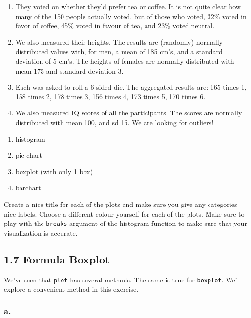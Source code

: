 \documentclass[]{article}
\providecommand{\tightlist}{%
  \setlength{\itemsep}{0pt}\setlength{\parskip}{0pt}}
\begin{document}
\begin{enumerate}
\def\labelenumi{\arabic{enumi}.}
\tightlist
\item
  They voted on whether they'd prefer tea or coffee. It is not quite
  clear how many of the 150 people actually voted, but of those who
  voted, 32\% voted in favor of coffee, 45\% voted in favour of tea, and
  23\% voted neutral.
\item
  We also measured their heights. The results are (randomly) normally
  distributed values with, for men, a mean of 185 cm's, and a standard
  deviation of 5 cm's. The heights of females are normally distributed
  with mean 175 and standard deviation 3.
\item
  Each was asked to roll a 6 sided die. The aggregated results are: 165
  times 1, 158 times 2, 178 times 3, 156 times 4, 173 times 5, 170 times
  6.
\item
  We also measured IQ scores of all the participants. The scores are
  normally distributed with mean 100, and sd 15. We are looking for
  outliers!
\end{enumerate}

\begin{enumerate}
\def\labelenumi{\alph{enumi}.}
\tightlist
\item
  histogram
\item
  pie chart
\item
  boxplot (with only 1 box)
\item
  barchart
\end{enumerate}

Create a nice title for each of the plots and make sure you give any
categories nice labels. Choose a different colour yourself for each of
the plots. Make sure to play with the \texttt{breaks} argument of the
histogram function to make sure that your visualization is accurate.

\hypertarget{formula-boxplot}{%
\subsection{1.7 Formula Boxplot}\label{formula-boxplot}}

We've seen that \texttt{plot} has several methods. The same is true for
\texttt{boxplot}. We'll explore a convenient method in this exercise.

\hypertarget{a.}{%
\subsubsection{a.}\label{a.}}
\end{document}
